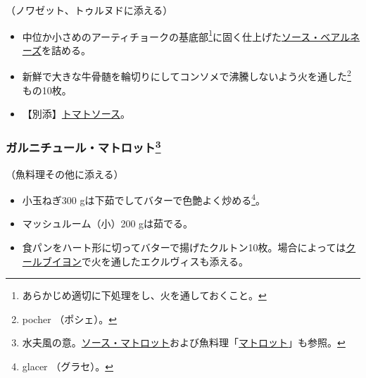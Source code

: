 \begin{recette}

（ノワゼット、トゥルヌドに添える）

\begin{itemize}
\item
  中位か小さめのアーティチョークの基底部\footnote{あらかじめ適切に下処理をし、火を通しておくこと。}に固く仕上げた\protect\hyperlink{sauce-bearnaise}{ソース・ベアルネーズ}を詰める。
\item
  新鮮で大きな牛骨髄を輪切りにしてコンソメで沸騰しないよう火を通した\footnote{pocher
    （ポシェ）。}もの10枚。
\item
  【別添】\protect\hyperlink{sauce-tomate}{トマトソース}。
\end{itemize}

\atoaki{}

\hypertarget{garniture-matelote}{%
\subsubsection[ガルニチュール・マトロット]{\texorpdfstring{ガルニチュール・マトロット\footnote{水夫風の意。\protect\hyperlink{sauce-matelote}{ソース・マトロット}および魚料理「\protect\hyperlink{matelotes-types}{マトロット}」も参照。}}{ガルニチュール・マトロット}}\label{garniture-matelote}}



（魚料理その他に添える）

\begin{itemize}
\item
  小玉ねぎ300 gは下茹でしてバターで色艶よく炒める\footnote{glacer
    （グラセ）。}。
\item
  マッシュルーム（小）200 gは茹でる。
\item
  食パンをハート形に切ってバターで揚げたクルトン10枚。場合によっては\protect\hyperlink{court-bouillon-c}{クールブイヨン}で火を通したエクルヴィスも添える。
\end{itemize}

\atoaki{}

\hypertarget{garniture-medicis}{%
}
\end{recette}
